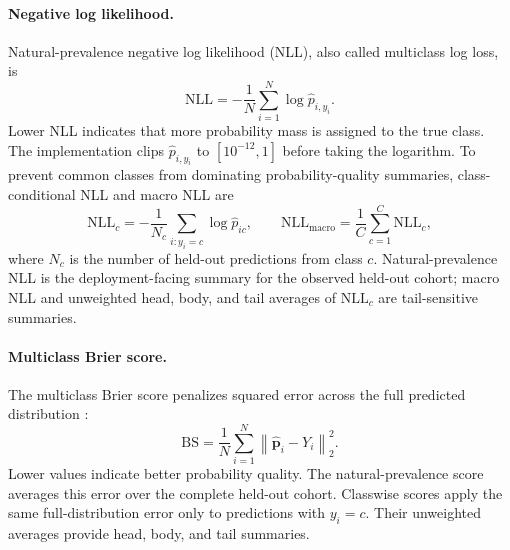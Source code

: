\documentclass[11pt]{article}
\begin{document}
\paragraph{Negative log likelihood.}
Natural-prevalence negative log likelihood (NLL), also called multiclass log loss, is
\begin{equation}
  \mathrm{NLL}=-\frac{1}{N}\sum_{i=1}^{N}\log \hat{p}_{i,y_i}.
  \label{eq:nll}
\end{equation}
\noindent Lower NLL indicates that more probability mass is assigned to the true class. The implementation clips $\hat{p}_{i,y_i}$ to $[10^{-12},1]$ before taking the logarithm. To prevent common classes from dominating probability-quality summaries, class-conditional NLL and macro NLL are
\begin{equation}
  \mathrm{NLL}_c=-\frac{1}{N_c}\sum_{i:y_i=c}\log \hat{p}_{ic},
  \qquad
  \mathrm{NLL}_{\mathrm{macro}}=\frac{1}{C}\sum_{c=1}^{C}\mathrm{NLL}_c,
  \label{eq:macro-nll}
\end{equation}
\noindent where $N_c$ is the number of held-out predictions from class $c$. Natural-prevalence NLL is the deployment-facing summary for the observed held-out cohort; macro NLL and unweighted head, body, and tail averages of $\mathrm{NLL}_c$ are tail-sensitive summaries.

\paragraph{Multiclass Brier score.}
The multiclass Brier score penalizes squared error across the full predicted distribution \citep{brier1950verification}:
\begin{equation}
  \mathrm{BS}=\frac{1}{N}\sum_{i=1}^{N}
  \left\|\hat{\mathbf{p}}_i-Y_i\right\|_2^2.
  \label{eq:brier}
\end{equation}
\noindent Lower values indicate better probability quality. The natural-prevalence score averages this error over the complete held-out cohort. Classwise scores apply the same full-distribution error only to predictions with $y_i=c$. Their unweighted averages provide head, body, and tail summaries.
\end{document}
